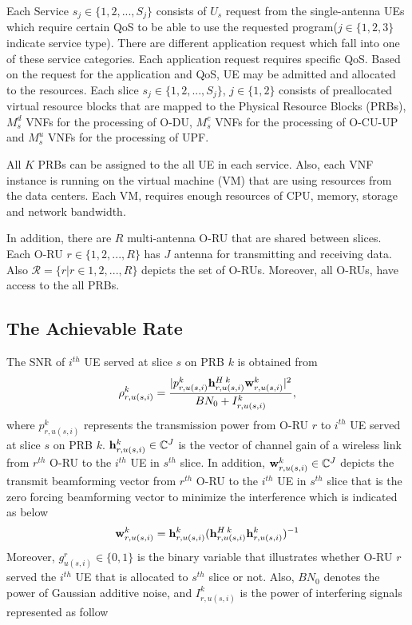 \documentclass[conference]{IEEEtran}
\begin{document}
Each Service $s_j\in \{1,2,...,S_j\} $ consists of $U_{s}$ request from the 
single-antenna UEs which require certain QoS to be able to use the requested program($j \in \{1,2,3\}$ indicate service type).
There are different application request which fall into one of these service categories. Each application request requires specific QoS. Based on the request for the application and QoS, UE may be admitted and allocated to the resources.
Each slice $s_j \in \{1,2,...,S_j \}$, $j \in \{1,2\}$ consists of  preallocated virtual resource blocks that are mapped to the Physical Resource Blocks (PRBs), $M_s^{d}$ VNFs for the processing of O-DU, $M_s^{c}$ VNFs for the processing of O-CU-UP and $M_s^{u}$ VNFs for the processing of UPF.

All $K$ PRBs can be assigned to the all UE in each service.
Also, each VNF instance is running on the virtual machine (VM) that are using resources from the data centers. Each VM, requires enough resources of CPU, memory, storage and network bandwidth.

In addition, there are $R$ multi-antenna O-RU that are shared between slices. Each O-RU $r \in \{1,2,...,R \}$
has $J$ antenna for transmitting and receiving data.
Also $\mathcal{R} = \{ r | r\in 1,2,...,R \}$ depicts the set of O-RUs.
Moreover, all O-RUs, have access to the all PRBs.
\subsection{The Achievable Rate}
The SNR of $i^{th}$ UE served at slice $s$ on PRB $k$ is obtained from
\begin{equation}\label{eq1}
\rho_{r,u(s,i)}^{k} =  \frac{|p_{r,u(s,i)}^{k}{\bold{h}_{r,u(s,i)}^{H \: k}} \bold{w}_{r,u(s,i)}^{k}|^2}{BN_0 + I_{r,u(s,i)}^{k}},
\end{equation} 
where $p_{r,u(s,i)}^{k}$ represents the transmission power from O-RU $r$ to $i^{th}$ UE served at slice $s$ on PRB $k$. 
${\bold{h}_{r,u(s,i)}^{k}} \in \mathbb{C}^{J}$ is the vector of channel gain of a wireless link from 
$r^{th}$ O-RU to the $i^{th}$ UE in $s^{th}$ slice. In addition, $\bold{w}_{r,u(s,i)}^{k} \in \mathbb{C}^{J}$ depicts the  transmit beamforming vector from $r^{th}$ O-RU to the $i^{th}$ UE in $s^{th}$ slice that is the zero forcing beamforming vector to minimize the interference which is indicated as below
\begin{equation}
\bold{w}_{r,u(s,i)}^{k} = {\bold{h}_{r,u(s,i)}^{k}}({\bold{h}_{r,u(s,i)}^{H \: k}} {\bold{h}_{r,u(s,i)}^{k}})^{-1}
\end{equation}
Moreover, $g_{u(s,i)}^r \in \{0,1\}$ is the binary variable that illustrates whether O-RU $r$ served the $i^{th}$ UE that is allocated to $s^{th}$ slice or not. 
Also, $BN_0$ denotes the power of Gaussian additive noise, and $I_{r,u(s,i)}^{k}$ is the power of interfering signals represented as follow
\end{document}
